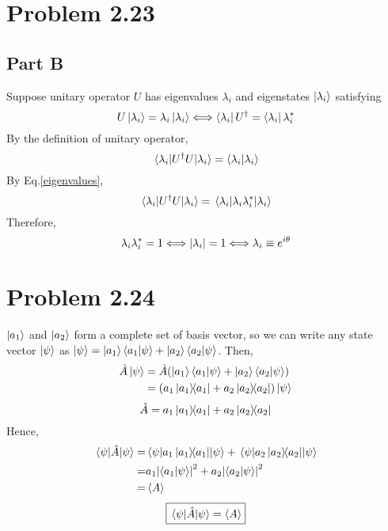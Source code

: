 \documentclass{article}
\begin{document}
\section*{Problem 2.23}
\subsection*{Part B}
Suppose unitary operator $U$ has eigenvalues $\lambda_i$ and eigenstates $\ket{\lambda_i}$ satisfying
\begin{equation}
  \label{eigenvalues}
  U\ket{\lambda_i} = \lambda_i \ket{\lambda_i}
  \Longleftrightarrow 
  \bra{\lambda_i}U^\dagger = \bra{\lambda_i}\lambda_i^*
\end{equation}
By the definition of unitary operator, 
\[ 
  \expval{U^\dagger U}{\lambda_i} = \ip{\lambda_i}{\lambda_i}
\]
By Eq.\eqref{eigenvalues},
\[ 
  \expval{U^\dagger U}{\lambda_i} = \expval{\lambda_i \lambda_i^*}{\lambda_i}
\]
Therefore,
\[
  \lambda_i\lambda_i^*=1 \Longleftrightarrow
  \abs{\lambda_i} =1 \Longleftrightarrow
  \lambda_i \equiv e^{i\theta}
\]

\section*{Problem 2.24}
$\ket{a_1}$ and $\ket{a_2}$ form a complete set of basis vector, so we can write any state vector $\ket{\psi}$ as $\ket{\psi} = \ket{a_1}\ip{a_1}{\psi}+\ket{a_2}\ip{a_2}{\psi}$. Then,
\[ 
  \begin{split}
    \hat{A}\ket{\psi} 
    &= \hat{A} (\ket{a_1}\ip{a_1}{\psi}+\ket{a_2}\ip{a_2}{\psi}) \\
    &= (a_1 \dyad{a_1} + a_2 \dyad{a_2}) \ket{\psi}
  \end{split}
\]
\[ 
   \hat{A} = a_1 \dyad{a_1} + a_2 \dyad{a_2}
\]
Hence,
\[ 
  \begin{split}
    \expval{\hat{A}}{\psi}
    =& \ev{a_1 \dyad{a_1}}{\psi} + \ev{a_2 \dyad{a_2}}{\psi} \\
    =& a_1 \abs{\ip{a_1}{\psi}}^2 + a_2 \abs{\ip{a_2}{\psi}}^2 \\
    =& \expval{A}
  \end{split}
\]
\[ 
  \boxed{
    \expval{\hat{A}}{\psi} = \expval{A}
  }
\]
\end{document}
